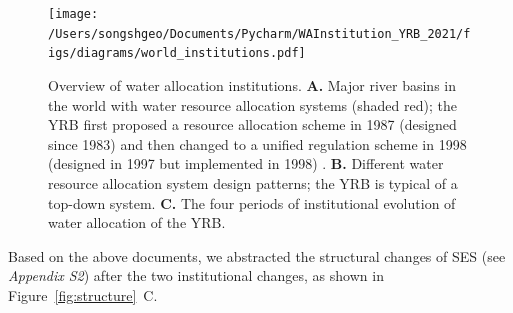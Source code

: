\documentclass[default, sn-standardnature]{sn-jnl} %
\begin{document}
\begin{figure}[!htb]
    \centering
    \texttt{[image: /Users/songshgeo/Documents/Pycharm/WAInstitution\_YRB\_2021/figs/diagrams/world\_institutions.pdf]}
	\caption{
		Overview of water allocation institutions.
		\textbf{A.} Major river basins in the world with water resource allocation systems (shaded red); the YRB first proposed a resource allocation scheme in 1987 (designed since 1983) and then changed to a unified regulation scheme in 1998 (designed in 1997 but implemented in 1998) \cite{speed2013}.
		\textbf{B.} Different water resource allocation system design patterns; the YRB is typical of a top-down system.
		\textbf{C.} The four periods of institutional evolution of water allocation of the YRB.
	}
    \label{fig:world}
\end{figure}

Based on the above documents, we abstracted the structural changes of SES (see \textit{Appendix S2}) after the two institutional changes, as shown in Figure~\ref{fig:structure}~C.
\end{document}
